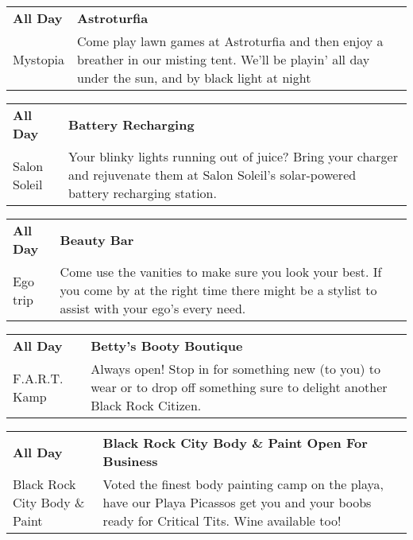 \begin{tabular}{ p{1in} p{2.2in} }
    \textbf{All Day} & \textbf{Astroturfia} \\
    Mystopia \newline  & Come play lawn games at Astroturfia and then enjoy a breather in our misting tent. We'll be playin' all day under the sun, and by black light at night \\
    \hline 
\end{tabular}
    
\begin{tabular}{ p{1in} p{2.2in} }
    \textbf{All Day} & \textbf{Battery Recharging} \\
    Salon Soleil \newline  & Your blinky lights running out of juice? Bring your charger and rejuvenate them at Salon Soleil's solar-powered battery recharging station. \\
    \hline 
\end{tabular}
    
\begin{tabular}{ p{1in} p{2.2in} }
    \textbf{All Day} & \textbf{Beauty Bar} \\
    Ego trip \newline  & Come use the vanities to make sure you look your best. If you come by at the right time there might be a stylist to assist with your ego's every need. \\
    \hline 
\end{tabular}
    
\begin{tabular}{ p{1in} p{2.2in} }
    \textbf{All Day} & \textbf{Betty's Booty Boutique} \\
    F.A.R.T. Kamp \newline  & Always open! Stop in for something new (to you) to wear or to drop off something sure to delight another Black Rock Citizen. \\
    \hline 
\end{tabular}
    
\begin{tabular}{ p{1in} p{2.2in} }
    \textbf{All Day} & \textbf{Black Rock City Body \& Paint Open For Business} \\
    Black Rock City Body \& Paint \newline  & Voted the finest body painting camp on the playa, have our Playa Picassos get you and your boobs ready for Critical Tits. Wine available too! \\
    \hline 
\end{tabular}
    
